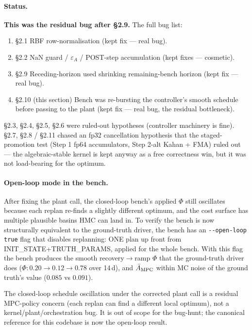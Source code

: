 \documentclass[11pt,a4paper]{article}
\begin{document}
\paragraph{Status.}
\textbf{This was the residual bug after \S 2.9.} The full bug list:

\begin{enumerate}[itemsep=2pt,leftmargin=*]
\item \S 2.1 RBF row-normalisation (kept fix --- real bug).
\item \S 2.2 NaN guard / $\varepsilon_A$ / POST-step accumulation
  (kept fixes --- cosmetic).
\item \S 2.9 Receding-horizon used shrinking remaining-bench
  horizon (kept fix --- real bug).
\item \S 2.10 (this section) Bench was re-bursting the controller's
  smooth schedule before passing to the plant (kept fix --- real
  bug, the residual bottleneck).
\end{enumerate}

\S 2.3, \S 2.4, \S 2.5, \S 2.6 were ruled-out hypotheses (controller
machinery is fine). \S 2.7, \S 2.8 / \S 2.11 chased an fp32
cancellation hypothesis that the staged-promotion test (Step 1
fp64 accumulators, Step 2-alt Kahan + FMA) ruled out --- the
algebraic-stable kernel is kept anyway as a free correctness win,
but it was not load-bearing for the optimum.

\paragraph{Open-loop mode in the bench.}
After fixing the plant call, the closed-loop bench's applied $\Phi$
still oscillates because each replan re-finds a slightly different
optimum, and the cost surface has multiple plausible basins HMC can
land in. To verify the bench is now structurally equivalent to the
ground-truth driver, the bench has an \texttt{-{}-open-loop true}
flag that disables replanning: ONE plan up front from
INIT\_STATE+TRUTH\_PARAMS, applied for the whole bench. With this
flag the bench produces the smooth recovery$\to$ramp $\Phi$ that
the ground-truth driver does ($\Phi: 0.20 \to 0.12 \to 0.78$ over
14\,d), and $\bar A_{\rm MPC}$ within MC noise of the ground
truth's value ($0.085$ vs $0.091$).

The closed-loop schedule oscillation under the corrected plant call
is a residual MPC-policy concern (each replan can find a different
local optimum), not a kernel/plant/orchestration bug. It is out of
scope for the bug-hunt; the canonical reference for this codebase
is now the open-loop result.
\end{document}
